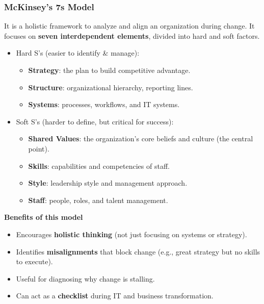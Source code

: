 \subsubsection{McKinsey's 7s Model}

\indent 

It is a holistic framework to analyze and align an organization during change. It focuses on \textbf{seven interdependent elements}, divided into hard and soft factors.

\begin{itemize}
    \item Hard S’s (easier to identify \& manage):
    \begin{itemize}
        \item \textbf{Strategy}: the plan to build competitive advantage.
        \item \textbf{Structure}: organizational hierarchy, reporting lines.
        \item \textbf{Systems}: processes, workflows, and IT systems.
    \end{itemize}
    \item Soft S’s (harder to define, but critical for success):
    \begin{itemize}
        \item \textbf{Shared Values}: the organization’s core beliefs and culture (the central point).
        \item \textbf{Skills}: capabilities and competencies of staff.
        \item \textbf{Style}: leadership style and management approach.
        \item \textbf{Staff}: people, roles, and talent management.
    \end{itemize}
\end{itemize}

\bigskip

\noindent\textbf{Benefits of this model}

\begin{itemize}
    \item Encourages \textbf{holistic thinking} (not just focusing on systems or strategy).
    \item Identifies \textbf{misalignments} that block change (e.g., great strategy but no skills to execute).
    \item Useful for diagnosing why change is stalling.
    \item Can act as a \textbf{checklist} during IT and business transformation.
\end{itemize}

